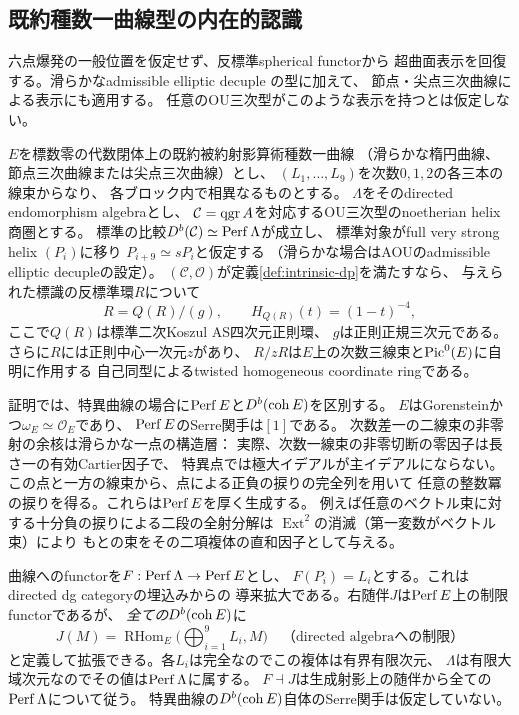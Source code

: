 \subsection{既約種数一曲線型の内在的認識}
\label{subsec:ou-elliptic-recognition}

六点爆発の一般位置を仮定せず、反標準spherical functorから
超曲面表示を回復する。滑らかなadmissible elliptic decuple
\cite[Definition~7.1, Lemma~7.4]{AOU2024}の型に加えて、
節点・尖点三次曲線による表示にも適用する。
任意のOU三次型がこのような表示を持つとは仮定しない。

\begin{theorem}[既約種数一曲線のhelixを持つ内在的三次候補]
\label{thm:ou-integral-elliptic-recognition}
$E$を標数零の代数閉体上の既約被約射影算術種数一曲線
（滑らかな楕円曲線、節点三次曲線または尖点三次曲線）とし、
$(L_1,\ldots,L_9)$を次数$0,1,2$の各三本の線束からなり、
各ブロック内で相異なるものとする。
$\Lambda$をそのdirected endomorphism algebraとし、
$\mathcal C=\operatorname{qgr} A$を対応するOU三次型のnoetherian helix商圏とする。
標準の比較$D^b(\mathcal C)\simeq\operatorname{Perf}\Lambda$が成立し、
標準対象がfull very strong helix $(P_i)$に移り
$P_{i+9}\simeq sP_i$と仮定する
（滑らかな場合はAOUのadmissible elliptic decupleの設定）。
$(\mathcal C,\mathcal O)$が定義\ref{def:intrinsic-dp}を満たすなら、
与えられた標識の反標準環$R$について
\[
 R=Q(R)/(g),\qquad H_{Q(R)}(t)=(1-t)^{-4},
\]
ここで$Q(R)$は標準二次Koszul AS四次元正則環、
$g$は正則正規三次元である。さらに$R$には正則中心一次元$z$があり、
$R/zR$は$E$上の次数三線束と$\operatorname{Pic}^0(E)$に自明に作用する
自己同型によるtwisted homogeneous coordinate ringである。
\end{theorem}

証明では、特異曲線の場合に$\operatorname{Perf} E$と$D^b(\operatorname{coh} E)$を区別する。
$E$はGorensteinかつ$\omega_E\simeq\mathcal O_E$であり、
$\operatorname{Perf} E$のSerre関手は$[1]$である。
次数差一の二線束の非零射の余核は滑らかな一点の構造層：
実際、次数一線束の非零切断の零因子は長さ一の有効Cartier因子で、
特異点では極大イデアルが主イデアルにならない。
この点と一方の線束から、点による正負の捩りの完全列を用いて
任意の整数冪の捩りを得る。これらは$\operatorname{Perf} E$を厚く生成する。
例えば任意のベクトル束に対する十分負の捩りによる二段の全射分解は
$\operatorname{Ext}^2$の消滅（第一変数がベクトル束）により
もとの束をその二項複体の直和因子として与える。

曲線へのfunctorを$F:\operatorname{Perf}\Lambda\to\operatorname{Perf} E$とし、
$F(P_i)=L_i$とする。これはdirected dg categoryの埋込みからの
導来拡大である。右随伴$J$は$\operatorname{Perf} E$上の制限functorであるが、
\emph{全ての}$D^b(\operatorname{coh} E)$に
\[
 J(M)=\operatorname{RHom}_E\bigl(\bigoplus_{i=1}^9 L_i,M\bigr)
 \quad\text{（directed algebraへの制限）}
\]
と定義して拡張できる。各$L_i$は完全なのでこの複体は有界有限次元、
$\Lambda$は有限大域次元なのでその値は$\operatorname{Perf}\Lambda$に属する。
$F\dashv J$は生成射影上の随伴から全ての$\operatorname{Perf}\Lambda$について従う。
特異曲線の$D^b(\operatorname{coh} E)$自体のSerre関手は仮定していない。


